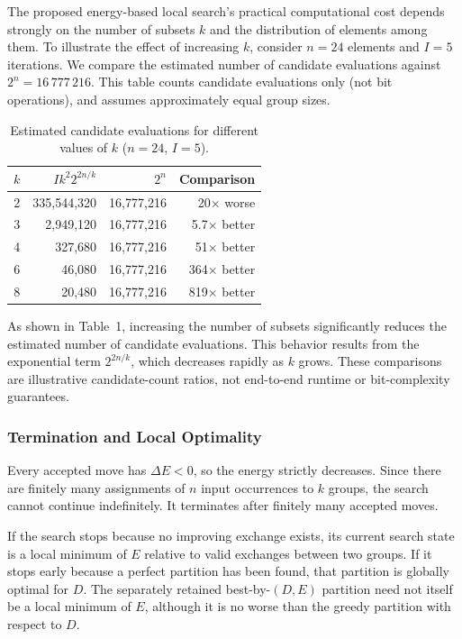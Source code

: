 \documentclass[11pt,a4paper]{article}
\begin{document}
The proposed energy-based local search's practical computational cost depends strongly on the number of subsets $k$ and the distribution of elements among them. To illustrate the effect of increasing $k$, consider $n=24$ elements and $I=5$ iterations. We compare the estimated number of candidate evaluations against $2^n=16\,777\,216$. This table counts candidate evaluations only (not bit operations), and assumes approximately equal group sizes.
\begin{table}[ht]
\centering
\caption{Estimated candidate evaluations for different values of $k$ ($n=24$, $I=5$).}
\begin{tabular}{rrrr}
\toprule
$k$ & $Ik^2 2^{2n/k}$ & $2^n$ & Comparison\\
\midrule
2 & 335,544,320 & 16,777,216 & 20$\times$ worse\\
3 & 2,949,120 & 16,777,216 & 5.7$\times$ better\\
4 & 327,680 & 16,777,216 & 51$\times$ better\\
6 & 46,080 & 16,777,216 & 364$\times$ better\\
8 & 20,480 & 16,777,216 & 819$\times$ better\\
\bottomrule
\end{tabular}
\end{table}
As shown in Table~1, increasing the number of subsets significantly reduces the estimated number of candidate evaluations. This behavior results from the exponential term $2^{2n/k}$, which decreases rapidly as $k$ grows. These comparisons are illustrative candidate-count ratios, not end-to-end runtime or bit-complexity guarantees.

\subsubsection{Termination and Local Optimality}
Every accepted move has $\Delta E<0$, so the energy strictly decreases. Since there are finitely many assignments of $n$ input occurrences to $k$ groups, the search cannot continue indefinitely. It terminates after finitely many accepted moves.

If the search stops because no improving exchange exists, its current search state is a local minimum of $E$ relative to valid exchanges between two groups. If it stops early because a perfect partition has been found, that partition is globally optimal for $D$. The separately retained best-by-$(D,E)$ partition need not itself be a local minimum of $E$, although it is no worse than the greedy partition with respect to $D$.
\end{document}
